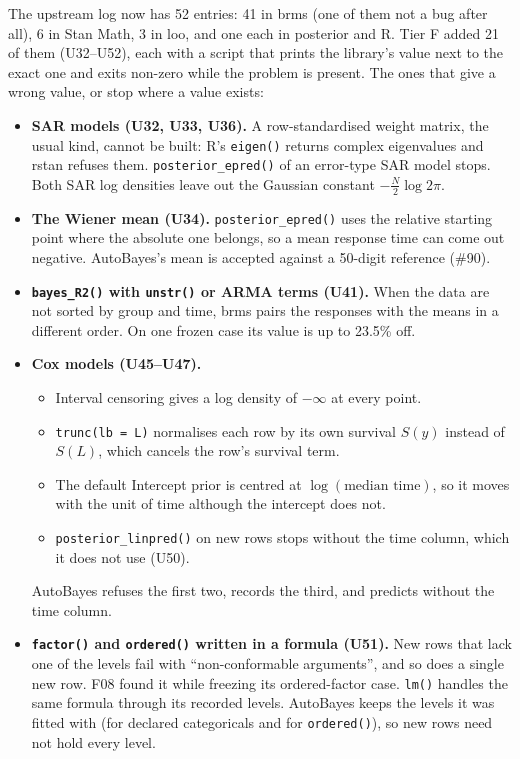 \documentclass[11pt]{article}
\newcommand{\code}[1]{\texttt{#1}}
\begin{document}
The upstream log now has 52 entries: 41 in brms (one of them not a bug after all), 6 in Stan Math, 3 in loo, and one each
in posterior and R. Tier F added 21 of them (U32--U52), each with a script that prints the library's value next to the
exact one and exits non-zero while the problem is present. The ones that give a wrong value, or stop where a value
exists:
\begin{itemize}
\item \textbf{SAR models (U32, U33, U36).} A row-standardised weight matrix, the usual kind, cannot be built: R's
  \code{eigen()} returns complex eigenvalues and rstan refuses them. \code{posterior\_epred()} of an error-type SAR model
  stops. Both SAR log densities leave out the Gaussian constant $-\tfrac{N}{2}\log 2\pi$.
\item \textbf{The Wiener mean (U34).} \code{posterior\_epred()} uses the relative starting point where the absolute one
  belongs, so a mean response time can come out negative. AutoBayes's mean is accepted against a 50-digit reference
  (\#90).
\item \textbf{\code{bayes\_R2()} with \code{unstr()} or ARMA terms (U41).} When the data are not sorted by group and time,
  brms pairs the responses with the means in a different order. On one frozen case its value is up to 23.5\% off.
\item \textbf{Cox models (U45--U47).}
  \begin{itemize}
  \item Interval censoring gives a log density of $-\infty$ at every point.
  \item \code{trunc(lb = L)} normalises each row by its own survival $S(y)$ instead of $S(L)$, which cancels the row's
    survival term.
  \item The default Intercept prior is centred at $\log(\text{median time})$, so it moves with the unit of time although
    the intercept does not.
  \item \code{posterior\_linpred()} on new rows stops without the time column, which it does not use (U50).
  \end{itemize}
  AutoBayes refuses the first two, records the third, and predicts without the time column.
\item \textbf{\code{factor()} and \code{ordered()} written in a formula (U51).} New rows that lack one of the levels fail
  with ``non-conformable arguments'', and so does a single new row. F08 found it while freezing its ordered-factor case.
  \code{lm()} handles the same formula through its recorded levels. AutoBayes keeps the levels it was fitted with (for
  declared categoricals and for \code{ordered()}), so new rows need not hold every level.
\end{itemize}
\end{document}

